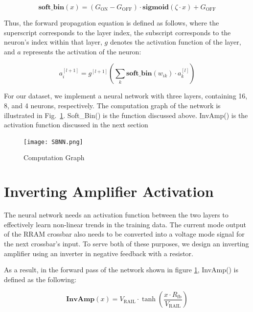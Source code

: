 \documentclass[conference]{IEEEtran}  %
\begin{document}
\vspace*{-3mm}
\begin{equation}
\textbf{soft\_bin}\left(x\right) = \left(G_{\text{ON}} - G_{\text{OFF}}\right) \cdot \textbf{sigmoid}\left(\zeta \cdot x\right) + G_{\text{OFF}}
\end{equation}


Thus, the forward propagation equation is defined as follows, where the superscript corresponds to the layer index, the subscript corresponds to the neuron's index within that layer, \( g \) denotes the activation function of the layer, and \( a \) represents the activation of the neuron:

\vspace*{-2mm}
\begin{equation}
a^{[l+1]}_{i} = g^{[l+1]} \left(\sum_k \textbf{soft\_bin}\left(w_{ik}\right) \cdot a^{[l]}_k \right)
\end{equation}

For our dataset, we implement a neural network with three layers, containing 16, 8, and 4 neurons, respectively. The computation graph of the network is illustrated in Fig.~\ref{fig:2}. Soft\_Bin() is the function discussed above. InvAmp() is the activation function discussed in the next section

\begin{figure}[h]
    \centering
    \texttt{[image: SBNN.png]}
    \caption{Computation Graph}
    \label{fig:2}
\end{figure}
\vspace*{-3mm}
\section{Inverting Amplifier Activation}

The neural network needs an activation function between the two layers to effectively learn non-linear trends in the training data. The current mode output of the RRAM crossbar also needs to be converted into a voltage mode signal for the next crossbar's input. To serve both of these purposes, we design an inverting amplifier using an inverter in negative feedback with a resistor. 

As a result, in the forward pass of the network shown in figure \ref{fig:2}, InvAmp() is defined as the following:

\begin{equation}
    \textbf{InvAmp}(x) = V_{\text{RAIL}} \cdot \tanh\left(\frac{x \cdot R_{\text{fb}}}{V_{\text{RAIL}}}\right)
\end{equation}
\end{document}
